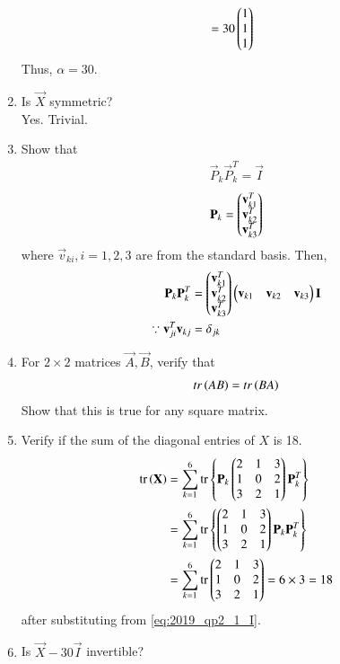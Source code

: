 \begin{enumerate}[label=\arabic*.,ref=\thesubsection.\theenumi]
\begin{align}
\nonumber \\
&= 30\begin{pmatrix}1 \\1 \\1\end{pmatrix} 
\end{align}
%
Thus, $\alpha=30$.
\item Is $\vec{X}$  symmetric?
\\
\solution Yes. Trivial.
\item Show that 
\begin{align}
\label{eq:2019_qp2_1_I}
\vec{P}_k\vec{P}_k^T = \vec{I}
\end{align}
\solution
\begin{align}
\mathbf{P}_k = \begin{pmatrix}\mathbf{v}_{k1}^T\\\mathbf{v}_{k2}^T\\\mathbf{v}_{k3}^T\end{pmatrix}
\end{align}
%
where $\vec{v}_{ki}, i = 1,2,3$ are from the standard basis.  Then,
\begin{align}
\mathbf{P}_k\mathbf{P}_k^T &= \begin{pmatrix}\mathbf{v}_{k1}^T\\\mathbf{v}_{k2}^T\\\mathbf{v}_{k3}^T\end{pmatrix}\begin{pmatrix}\mathbf{v}_{k1}&\mathbf{v}_{k2}&\mathbf{v}_{k3}\end{pmatrix}
 \mathbf{I}
\nonumber
\\
\because 
\mathbf{v}_{ji}^T\mathbf{v}_{kj} &= \delta_{jk}
\end{align}
%
\item For $2\times 2$ matrices $\vec{A},\vec{B}$, verify that 
\begin{align}
tr\left(AB\right)=tr\left(BA\right)
\end{align}
%
Show that this is true for any square matrix.
\item Verify if the sum of the diagonal entries of $X$ is 18.
\\
\solution 
\begin{align}
\text{tr}\left(\mathbf{X}\right) &= \sum_{k=1}^{6}\text{tr}\left\{\mathbf{P}_k\begin{pmatrix}2 & 1 & 3 \\ 1 & 0 & 2 \\ 3 & 2 & 1\end{pmatrix}\mathbf{P}_k^T\right\}
\nonumber \\
&= \sum_{k=1}^{6}\text{tr}\left\{\begin{pmatrix}2 & 1 & 3 \\ 1 & 0 & 2 \\ 3 & 2 & 1\end{pmatrix}\mathbf{P}_k\mathbf{P}_k^T\right\}
\nonumber \\
&= \sum_{k=1}^{6}\text{tr}\begin{pmatrix}2 & 1 & 3 \\ 1 & 0 & 2 \\ 3 & 2 & 1\end{pmatrix} = 6\times 3 = 18
\end{align}
after substituting from \eqref{eq:2019_qp2_1_I}.
%
\item Is $\vec{X}-30\vec{I}$ invertible?

\end{enumerate}
